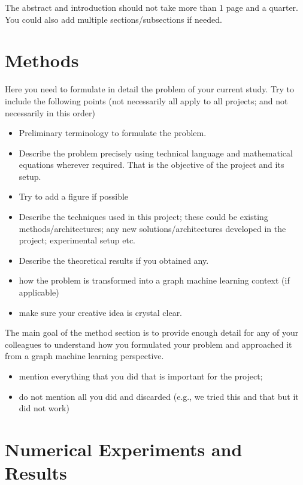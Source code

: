 \documentclass{article}
\begin{document}
The abstract and introduction should not take more than 1 page and a quarter. You could also add multiple sections/subsections if needed.

\section{Methods}

Here you need to formulate in detail the problem of your current study. Try to include the following points (not necessarily all apply to all projects; and not necessarily in this order)

\begin{itemize}
    \item Preliminary terminology to formulate the problem.
    \item Describe the problem precisely using technical language and mathematical equations wherever required. That is the objective of the project and its setup.
    \item Try to add a figure if possible
    \item Describe the techniques used in this project; these could be existing methods/architectures; any new solutions/architectures developed in the project; experimental setup etc.
    \item Describe the theoretical results if you obtained any.
    \item how the problem is transformed into a graph machine learning context (if applicable)
    \item make sure your creative idea is crystal clear.
\end{itemize}

The main goal of the method section is to provide enough detail for any of your colleagues to understand how you formulated your problem and approached it from a graph machine learning perspective.

\begin{itemize}
    \item mention everything that you did that is important for the project;
    \item do not mention all you did and discarded (e.g., we tried this and that but it did not work)
\end{itemize}

\section{Numerical Experiments and Results}
\end{document}
